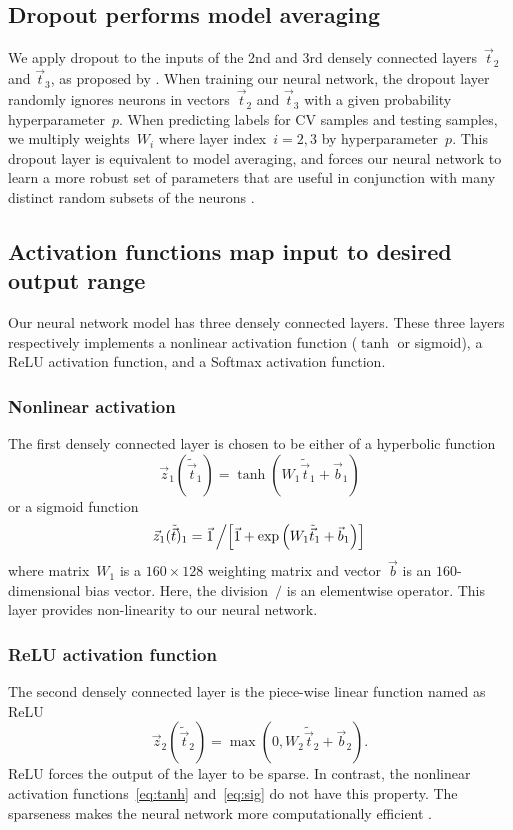 \subsection{Dropout performs model averaging}
We apply dropout to the inputs of the 2nd and 3rd densely connected layers~$\vec t_2$ and $\vec t_3$, as proposed by \citet{dropout}. 
When training our neural network, the dropout layer randomly ignores neurons in vectors~$\vec t_2$ and $\vec t_3$ with a given probability hyperparameter~$p$. 
When predicting labels for CV samples and testing samples, we multiply weights~$W_i$ where layer index~$i=2,3$ by hyperparameter~$p$. This dropout layer is equivalent to model averaging, and forces our neural network to learn a more robust set of parameters that are useful in conjunction with many distinct random subsets of the neurons \citep{DBLP:journals/corr/abs-1207-0580}.

\subsection{Activation functions map input to desired output range}
Our neural network model has three densely connected layers. These three layers respectively implements a nonlinear activation function ($\tanh$ or sigmoid), a ReLU activation function, and a Softmax activation function.
\subsubsection{Nonlinear activation\label{sec:nonl}}
The first densely connected layer is chosen to be either of a hyperbolic function 
\begin{equation}
 \vec z_1(\tilde{\vec  t}_1)=\tanh(W_1\tilde{\vec  t}_1+\vec b_1) \label{eq:tanh}
\end{equation}
or a sigmoid function 
\begin{equation}
  \vec z_1 (\tilde{\vec  t})_1 =  {\vec 1}\left/\left[\vec 1 + \exp\left(W_1\tilde{\vec  t}_1+\vec b_1 \right)\right]\right.  \label{eq:sig}
\end{equation}
where matrix~$W_1$ is a $160\times128$ weighting matrix and vector~$\vec b$ is an $160$-dimensional bias vector. 
Here, the division~$/$ is an elementwise operator.
This layer provides non-linearity to our neural network.
\subsubsection{ReLU activation function}
The second densely connected layer is the piece-wise linear function named as ReLU
\begin{equation*}
   \vec z_2(\tilde{\vec  t}_2)=\max(0,W_2\tilde{\vec  t}_2+\vec b_2).
\end{equation*} 
ReLU forces the output of the layer to be sparse. In contrast, the nonlinear activation functions~\eqref{eq:tanh} and~\eqref{eq:sig} do not have this property. 
The sparseness makes the neural network more computationally efficient \citep{NIPS20145267}.
